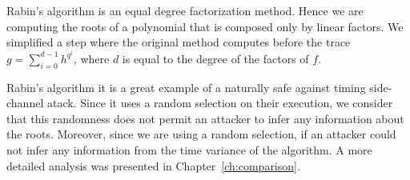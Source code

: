 Rabin's algorithm is an equal degree factorization method. Hence we are computing the roots of a polynomial that is composed only by linear factors. We simplified a step where the original method computes before the trace $g = \sum_{i=0}^{d-1} h^{q^{i}}$, where $d$ is equal to the degree of the factors of $f$. 

Rabin's algorithm it is a great example of a naturally safe against timing side-channel atack. Since it uses a random selection on their execution, we consider that this randomness does not permit an attacker to infer any information about the roots. Moreover, since we are using a random selection, if an attacker could not infer any information from the time variance of the algorithm. A more detailed analysis was presented in Chapter~\ref{ch:comparison}.

